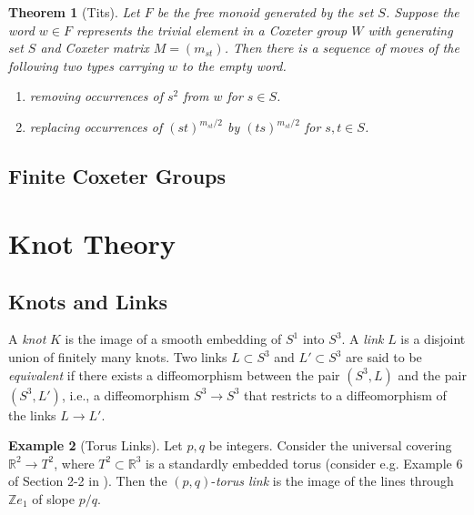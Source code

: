 \documentclass{article}
\newtheorem{theorem}{Theorem}[section]
\theoremstyle{definition}
\newtheorem{example}[theorem]{Example}
\begin{document}
\begin{theorem}[Tits]\label{thm:word-problem}
Let $F$ be the free monoid generated by the set $S$. Suppose the word $w \in F$ represents the trivial element in a Coxeter group $W$ with generating set $S$ and Coxeter matrix $M = (m_{st})$. Then there is a sequence of moves of the following two types carrying $w$ to the empty word.

\begin{enumerate}
\item removing occurrences of $s^2$ from $w$ for $s \in S$.
\item replacing occurrences of $(st)^{m_{st}/2}$ by $(ts)^{m_{st}/2}$ for $s, t \in S$.
\end{enumerate}
\end{theorem}

\subsection{Finite Coxeter Groups}

\newpage

\section{Knot Theory}
\subsection{Knots and Links}
A \textit{knot} $K$ is the image of a smooth embedding of $S^1$ into $S^3$. A \textit{link} $L$ is a disjoint union of finitely many knots. Two links $L \subset S^3$ and $L' \subset S^3$ are said to be \textit{equivalent} if there exists a diffeomorphism between the pair $(S^3, L)$ and the pair $(S^3, L')$, i.e., a diffeomorphism $S^3 \rightarrow S^3$ that restricts to a diffeomorphism of the links $L \rightarrow L'$.

\begin{example}[Torus Links]
Let $p, q$ be integers. Consider the universal covering $\mathbb{R}^2 \rightarrow T^2$, where $T^2 \subset \mathbb{R}^3$ is a standardly embedded torus (consider e.g. Example 6 of Section 2-2 in \cite{docarmo1976}). Then the $(p,q)$-\textit{torus link} is the image of the lines through $\mathbb{Z}e_1$ of slope $p/q$.
\end{example}
\end{document}
